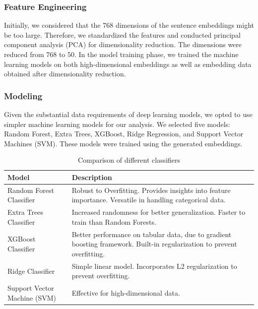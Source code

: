 \documentclass[]{style/ceurart}
\begin{document}
\subsubsection{Feature Engineering}

Initially, we considered that the 768 dimensions of the sentence embeddings might be too large. Therefore, we standardized the features and conducted principal component analysis (PCA) for dimensionality reduction\cite{fodor_survey_2002}. The dimensions were reduced from 768 to 50. In the model training phase, we trained the machine learning models on both high-dimensional embeddings as well as embedding data obtained after dimensionality reduction.

\subsubsection{Modeling}

Given the substantial data requirements of deep learning models, we opted to use simpler machine learning models for our analysis. We selected five models: Random Forest, Extra Trees, XGBoost, Ridge Regression, and Support Vector Machines (SVM). These models were trained using the generated embeddings.

\begin{table}[h]
\centering
\caption{Comparison of different classifiers}
\renewcommand{\arraystretch}{1.2}
\begin{tabular}{@{}lp{10cm}@{}}
\toprule
\textbf{Model} & \textbf{Description} \\ \midrule
Random Forest Classifier & Robust to Overfitting. Provides insights into feature importance. Versatile in handling categorical data. \\ \midrule
Extra Trees Classifier & Increased randomness for better generalization. Faster to train than Random Forests. \\ \midrule
XGBoost Classifier & Better performance on tabular data, due to gradient boosting framework. Built-in regularization to prevent overfitting. \\ \midrule
Ridge Classifier & Simple linear model. Incorporates L2 regularization to prevent overfitting. \\ \midrule
Support Vector Machine (SVM) & Effective for high-dimensional data. \\ \bottomrule
\end{tabular}
\end{table}
\end{document}
